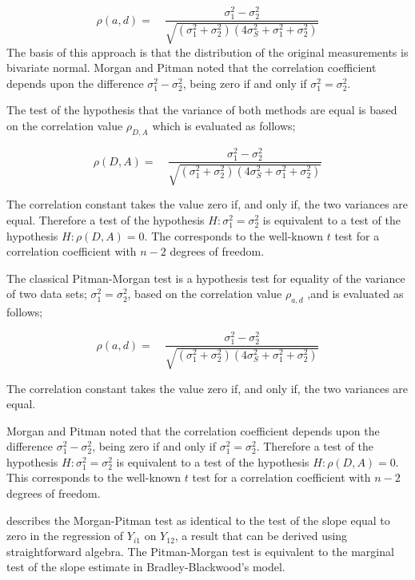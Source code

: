 \documentclass[12pt, a4paper]{report}
\theoremstyle{plain}
\theoremstyle{definition}
\theoremstyle{remark}
\begin{document}
\begin{equation}
\rho(a,d)=\quad\frac{\sigma^{2}_{1}-\sigma^{2}_{2}}{\sqrt{(\sigma^{2}_{1}+\sigma^{2}_{2})(4\sigma^{2}_{S}+\sigma^{2}_{1}+\sigma^{2}_{2})}}
\end{equation}
The basis of this approach is that the
distribution of the original measurements is bivariate normal.
Morgan and Pitman noted that the correlation coefficient depends
upon the difference $\sigma^{2}_{1}- \sigma^{2}_{2}$, being zero
if and only if $\sigma^{2}_{1}=\sigma^{2}_{2}$.

The test of the hypothesis that the variance of both methods are
equal is based on the correlation value $\rho_{D,A}$ which is
evaluated as follows;

\begin{equation}
\rho(D,A)=\quad\frac{\sigma^{2}_{1}-\sigma^{2}_{2}}{\sqrt{(\sigma^{2}_{1}+\sigma^{2}_{2})(4\sigma^{2}_{S}+\sigma^{2}_{1}+\sigma^{2}_{2})}}
\end{equation}

The correlation constant takes the value zero if, and only if, the
two variances are equal. Therefore a test of the hypothesis $H:
\sigma^{2}_{1}=\sigma^{2}_{2}$ is equivalent to a test of the
hypothesis $H: \rho(D,A) = 0$. The corresponds to the well-known
$t$ test for a correlation coefficient with $n-2$ degrees of
freedom.

The classical Pitman-Morgan test is a hypothesis test for equality of the variance of two data sets; $\sigma^{2}_{1} =
\sigma^{2}_{2}$, based on the correlation value $\rho_{a,d}$ ,and is evaluated as follows;

\begin{equation}
\rho(a,d)=\quad\frac{\sigma^{2}_{1}-\sigma^{2}_{2}}{\sqrt{(\sigma^{2}_{1}+\sigma^{2}_{2})(4\sigma^{2}_{S}+\sigma^{2}_{1}+\sigma^{2}_{2})}}
\end{equation}

The correlation constant takes the value zero if, and only if, the
two variances are equal. 

Morgan and Pitman noted that the correlation coefficient depends
upon the difference $\sigma^{2}_{1}- \sigma^{2}_{2}$, being zero
if and only if $\sigma^{2}_{1}=\sigma^{2}_{2}$.
Therefore a test of the hypothesis $H: \sigma^{2}_{1}=\sigma^{2}_{2}$ is equivalent to a test of the hypothesis $H: \rho(D,A) = 0$. This corresponds to the well-known $t$ test for a correlation coefficient with $n-2$ degrees of freedom. 


\citet{Bartko} describes the Morgan-Pitman test as identical to the test of the slope equal to zero in the regression of $Y_{i1}$ on $Y_{12}$, a result that can be derived using straightforward algebra. The Pitman-Morgan test is equivalent to the marginal test of the slope estimate in Bradley-Blackwood’s model.
\end{document}
